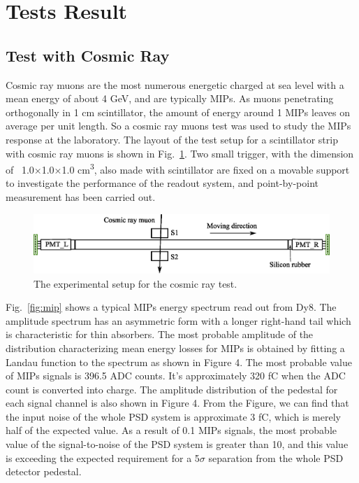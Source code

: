 \documentclass[5p, times]{elsarticle}
\begin{document}
\section{Tests Result}
\label{sec:result}

\subsection{Test with Cosmic Ray}
\label{sec:cosmicray}

Cosmic ray muons are the most numerous energetic charged at sea level with a mean energy of about 4 GeV, and are
typically MIPs. As muons penetrating orthogonally in 1 cm scintillator, the amount of energy around 1 MIPs leaves on
average per unit length. So a cosmic ray muons test was used to study the MIPs response at the laboratory. The layout
of the test setup for a scintillator strip with cosmic ray muons is shown in Fig.~\ref{fig:cosmic_test}. Two small trigger, with the
dimension of \ 1.0×1.0×1.0 cm\textsuperscript{3}, also made with scintillator are fixed on a movable support to
investigate the performance of the readout system, and point-by-point measurement has been carried out. 

\begin{figure}
 \centering
 \includegraphics[width=140mm]{cosmic_test}
\caption{The experimental setup for the cosmic ray test.}
\label{fig:cosmic_test}
\end{figure} 

Fig.~\ref{fig:mip} shows a typical MIPs energy spectrum read out from Dy8. The amplitude spectrum has an asymmetric form with a
longer right-hand tail which is characteristic for thin absorbers. The most probable amplitude of the distribution
characterizing mean energy losses for MIPs is obtained by fitting a Landau function to the spectrum as shown in Figure
4. The most probable value of MIPs signals is 396.5 ADC counts. It’s approximately 320 fC when the ADC count is
converted into charge. The amplitude distribution of the pedestal for each signal channel is also shown in Figure 4.
From the Figure, we can find that the input noise of the whole PSD system is approximate 3 fC, which is merely half of
the expected value. As a result of 0.1 MIPs signals, the most probable value of the signal-to-noise of the PSD system
is greater than 10, and this value is exceeding the expected requirement for a 5$\sigma $ separation from the whole PSD
detector pedestal.
\end{document}
